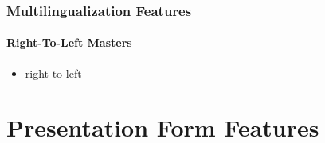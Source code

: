 \begin{comment}
*****  [[elisp:(org-cycle)][| ]]  [[elisp:(blee:ppmm:org-mode-toggle)][Nat]] [[elisp:(beginning-of-buffer)][Top]] [[elisp:(delete-other-windows)][(1)]] || /Frame/ *Label=MultilingualizationFeatures*  Multilingualization Features ::  [[elisp:(org-cycle)][| ]]
\end{comment}

\begin{frame}[fragile,label=MultilingualizationFeatures]
    \frametitle{Multilingualization Features}
    \framesubtitle{Right-To-Left Masters}

    \begin{itemize}
    \item right-to-left
    \end{itemize}

\end{frame}


\begin{comment}
*  [[elisp:(org-cycle)][| ]] [[elisp:(org-show-subtree)][|=]] [[elisp:(show-children 10)][|V]] [[elisp:(bx:orgm:indirectBufOther)][|>]] [[elisp:(bx:orgm:indirectBufMain)][|I]] [[elisp:(blee:ppmm:org-mode-toggle)][|N]] [[elisp:(org-top-overview)][|O]] [[elisp:(progn (org-shifttab) (org-content))][|C]] [[elisp:(delete-other-windows)][|1]]  /Section/   Presentation Form Features ::  [[elisp:(org-cycle)][| ]]
\end{comment}

\section{Presentation Form Features}

\begin{comment}
*****  [[elisp:(org-cycle)][| ]]  [[elisp:(blee:ppmm:org-mode-toggle)][Nat]] [[elisp:(beginning-of-buffer)][Top]] [[elisp:(delete-other-windows)][(1)]] || /Frame/ *Label=DifferentWaysofBuildingTheContent*  Different Ways of Building The Content ::  [[elisp:(org-cycle)][| ]]
\end{comment}

